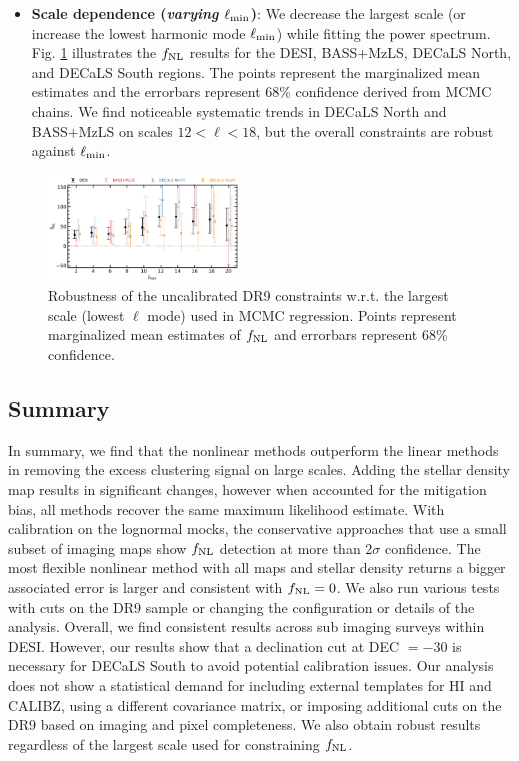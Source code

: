 \begin{itemize}
\item \textbf{Scale dependence (\textit{varying $\ell_{\rm min}$})}: We decrease the largest scale (or increase the lowest harmonic mode $\ell_{\rm min}$) while fitting the power spectrum. Fig. \ref{fig:mcmc_dr9elmin} illustrates the $f_{\rm NL}$ results for the DESI, BASS+MzLS, DECaLS North, and DECaLS South regions. The points represent the marginalized mean estimates and the errorbars represent $68$\% confidence derived from MCMC chains. We find noticeable systematic trends in DECaLS North and BASS+MzLS on scales $12<\ell<18$, but the overall constraints are robust against $\ell_{\rm min}$.

\end{itemize}

\begin{figure}
    \centering
    \includegraphics[width=0.45\textwidth]{figures/fnl_elmin.pdf}     
    \caption{Robustness of the uncalibrated DR9 constraints w.r.t. the largest scale (lowest $\ell$ mode) used in MCMC regression. Points represent marginalized mean estimates of $f_{\rm NL}$ and errorbars represent $68$\% confidence.}\label{fig:mcmc_dr9elmin}
\end{figure}


\subsection{Summary}
In summary, we find that the nonlinear methods outperform the linear methods in removing the excess clustering signal on large scales. Adding the stellar density map results in significant changes, however when accounted for the mitigation bias, all methods recover the same maximum likelihood estimate. With calibration on the lognormal mocks, the conservative approaches that use a small subset of imaging maps show $f_{\rm NL}$ detection at more than $2\sigma$ confidence. The most flexible nonlinear method with all maps and stellar density returns a bigger associated error is larger and consistent with $f_{\rm NL}=0$. We also run various tests with cuts on the DR9 sample or changing the configuration or details of the analysis. Overall, we find consistent results across sub imaging surveys within DESI. However, our results show that a declination cut at DEC $=-30$ is necessary for DECaLS South to avoid potential calibration issues. Our analysis does not show a statistical demand for including external templates for HI and CALIBZ, using a different covariance matrix, or imposing additional cuts on the DR9 based on imaging and pixel completeness. We also obtain robust results regardless of the largest scale used for constraining $f_{\rm NL}$.
